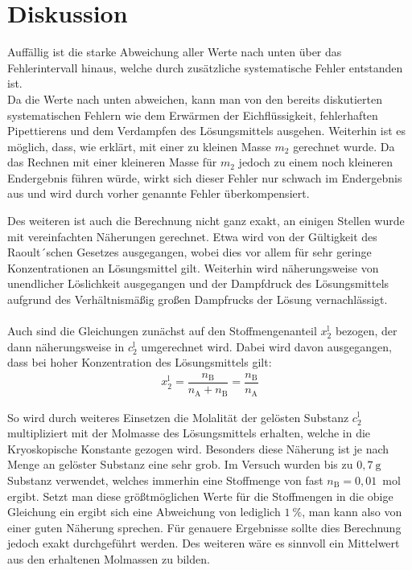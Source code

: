 \documentclass[12pt,a4paper,titlepage,headinclude,bibtotoc]{scrartcl}
\begin{document}
\section{Diskussion}
Auffällig ist die starke Abweichung aller Werte nach unten über das Fehlerintervall hinaus, welche durch zusätzliche systematische Fehler entstanden ist.\\
Da die Werte nach unten abweichen, kann man von den bereits diskutierten systematischen Fehlern wie dem Erwärmen der Eichflüssigkeit, fehlerhaften Pipettierens und dem Verdampfen des Lösungsmittels ausgehen. Weiterhin ist es möglich, dass, wie erklärt, mit einer zu kleinen Masse $m_2$ gerechnet wurde. Da das Rechnen mit einer kleineren Masse für $m_2$ jedoch zu einem noch kleineren Endergebnis führen würde, wirkt sich dieser Fehler nur schwach im Endergebnis aus und wird durch vorher genannte Fehler überkompensiert.     

Des weiteren ist auch die Berechnung nicht ganz exakt, an einigen Stellen wurde mit vereinfachten Näherungen gerechnet. Etwa wird von der Gültigkeit des Raoult´schen Gesetzes ausgegangen, wobei dies vor allem für sehr geringe Konzentrationen an Lösungsmittel gilt. Weiterhin wird näherungsweise von unendlicher Löslichkeit ausgegangen und der Dampfdruck des Lösungsmittels aufgrund des Verhältnismäßig großen Dampfrucks der Lösung vernachlässigt.\\\\
Auch sind die Gleichungen zunächst auf den Stoffmengenanteil $x_2^\mathrm{l}$ bezogen, der dann näherungsweise in $c_2^\mathrm{l}$ umgerechnet wird. Dabei wird davon ausgegangen, dass bei hoher Konzentration des Lösungsmittels gilt:
\begin{align}
x_2^\mathrm{l} = \dfrac{n_\mathrm{B}}{n_\mathrm{A} + n_\mathrm{B}} = \dfrac{n_\mathrm{B}}{n_\mathrm{A}}
\end{align}   

So wird durch weiteres Einsetzen die Molalität der gelösten Substanz $c_2^\mathrm{l}$ multipliziert mit der Molmasse des Lösungsmittels erhalten, welche in die Kryoskopische Konstante gezogen wird. Besonders diese Näherung ist je nach Menge an gelöster Substanz eine sehr grob. Im Versuch wurden bis zu $0,7{~}\mathrm{g}$ Substanz verwendet, welches immerhin eine Stoffmenge von fast $n_\mathrm{B} = 0,01${~}mol ergibt. Setzt man diese größtmöglichen Werte für die Stoffmengen in die obige Gleichung ein ergibt sich eine Abweichung von lediglich $1 {~} \% $, man kann also von einer guten Näherung sprechen. Für genauere Ergebnisse sollte dies Berechnung jedoch exakt durchgeführt werden. Des weiteren wäre es sinnvoll ein Mittelwert aus den erhaltenen Molmassen zu bilden.\\\\
  
\end{document}
